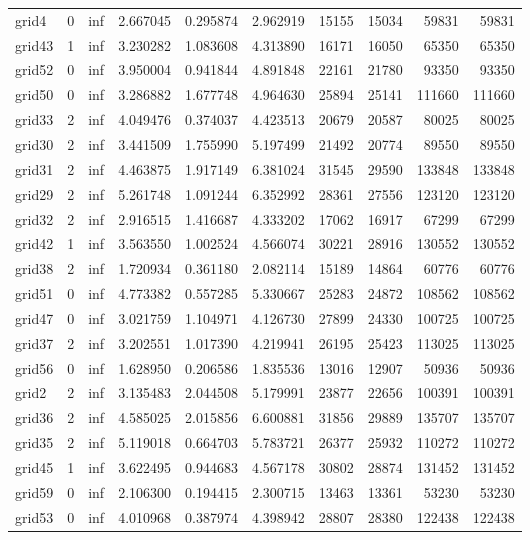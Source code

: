 \begin{longtable}{|l|r|r|r|r|r|r|r|r|r|}
grid4 & 0 & inf & 2.667045 & 0.295874 & 2.962919 & 15155 & 15034 & 59831 & 59831 \\
grid43 & 1 & inf & 3.230282 & 1.083608 & 4.313890 & 16171 & 16050 & 65350 & 65350 \\
grid52 & 0 & inf & 3.950004 & 0.941844 & 4.891848 & 22161 & 21780 & 93350 & 93350 \\
grid50 & 0 & inf & 3.286882 & 1.677748 & 4.964630 & 25894 & 25141 & 111660 & 111660 \\
grid33 & 2 & inf & 4.049476 & 0.374037 & 4.423513 & 20679 & 20587 & 80025 & 80025 \\
grid30 & 2 & inf & 3.441509 & 1.755990 & 5.197499 & 21492 & 20774 & 89550 & 89550 \\
grid31 & 2 & inf & 4.463875 & 1.917149 & 6.381024 & 31545 & 29590 & 133848 & 133848 \\
grid29 & 2 & inf & 5.261748 & 1.091244 & 6.352992 & 28361 & 27556 & 123120 & 123120 \\
grid32 & 2 & inf & 2.916515 & 1.416687 & 4.333202 & 17062 & 16917 & 67299 & 67299 \\
grid42 & 1 & inf & 3.563550 & 1.002524 & 4.566074 & 30221 & 28916 & 130552 & 130552 \\
grid38 & 2 & inf & 1.720934 & 0.361180 & 2.082114 & 15189 & 14864 & 60776 & 60776 \\
grid51 & 0 & inf & 4.773382 & 0.557285 & 5.330667 & 25283 & 24872 & 108562 & 108562 \\
grid47 & 0 & inf & 3.021759 & 1.104971 & 4.126730 & 27899 & 24330 & 100725 & 100725 \\
grid37 & 2 & inf & 3.202551 & 1.017390 & 4.219941 & 26195 & 25423 & 113025 & 113025 \\
grid56 & 0 & inf & 1.628950 & 0.206586 & 1.835536 & 13016 & 12907 & 50936 & 50936 \\
grid2 & 2 & inf & 3.135483 & 2.044508 & 5.179991 & 23877 & 22656 & 100391 & 100391 \\
grid36 & 2 & inf & 4.585025 & 2.015856 & 6.600881 & 31856 & 29889 & 135707 & 135707 \\
grid35 & 2 & inf & 5.119018 & 0.664703 & 5.783721 & 26377 & 25932 & 110272 & 110272 \\
grid45 & 1 & inf & 3.622495 & 0.944683 & 4.567178 & 30802 & 28874 & 131452 & 131452 \\
grid59 & 0 & inf & 2.106300 & 0.194415 & 2.300715 & 13463 & 13361 & 53230 & 53230 \\
grid53 & 0 & inf & 4.010968 & 0.387974 & 4.398942 & 28807 & 28380 & 122438 & 122438 \\

\end{longtable}
